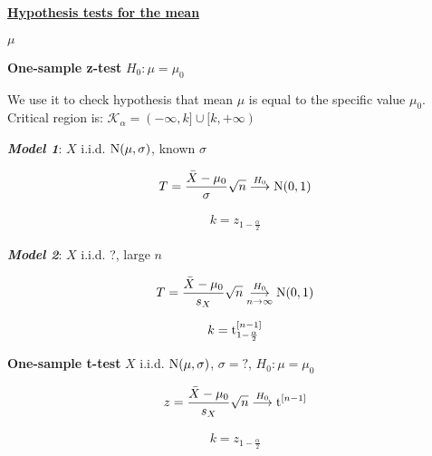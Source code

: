 \paragraph{\underline{Hypothesis tests for the mean}}
$\mu$

\vspace{5pt}
\noindent \textbf{One-sample z-test}
$H_0: \mu=\mu_0$

We use it to check hypothesis that mean $\mu$ is equal to the specific value $\mu_0$. Critical
region is: $ \mathcal{K}_\alpha = (-\infty, k] \cup [k, +\infty) $

\vspace{5pt}
\textbf{\em Model 1}:
$X$ i.i.d. $\textrm{N}(\mu, \sigma)$, known $\sigma$

\vspace{-15pt}
\begin{gather*}
T=\frac{\bar{X}-\mu_0}{\sigma}\sqrt{n} 
\overset{H_0}{\longrightarrow} \textrm{N}(0,1)
\end{gather*}

\vspace{-20pt}
\begin{gather*}
k = z_{1-\frac{\alpha}{2}}
\end{gather*}

\textbf{\em Model 2}:
$X$ i.i.d. ?, large $n$

\vspace{-15pt}
\begin{gather*}
T=\frac{\bar{X}-\mu_0}{s_X}\sqrt{n} 
\overset{H_0}{\underset{n \rightarrow \infty}{\longrightarrow}} \textrm{N}(0,1)
\end{gather*}

\vspace{-15pt}
\begin{gather*}
k = \textrm{t}^{[n-1]}_{1-\frac{\alpha}{2}}
\end{gather*}

\noindent \textbf{One-sample t-test}
$X$ i.i.d. $\textrm{N}(\mu, \sigma)$, $\sigma=?$, $H_0: \mu=\mu_0$

\vspace{-15pt}
\begin{gather*}
z=\frac{\bar{X}-\mu_0}{s_X}\sqrt{n} 
\overset{H_0}{\longrightarrow} \textrm{t}^{[n-1]}
\end{gather*}

\vspace{-15pt}
\begin{gather*}
k = z_{1-\frac{\alpha}{2}}
\end{gather*}

